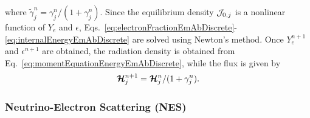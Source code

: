 \documentclass[10pt,preprint]{aastex}
\begin{document}
where $\tilde{\gamma}_{j}^{n}=\gamma_{j}^{n}/(1+\gamma_{j}^{n})$.  
Since the equilibrium density $\mathcal{J}_{0,j}$ is a nonlinear function of $Y_{e}$ and $\epsilon$, Eqs.~\eqref{eq:electronFractionEmAbDiscrete}-\eqref{eq:internalEnergyEmAbDiscrete} are solved using Newton's method.  
Once $Y_{e}^{n+1}$ and $\epsilon^{n+1}$ are obtained, the radiation density is obtained from Eq.~\eqref{eq:momentEquationEnergyEmAbDiscrete}, while the flux is given by
\begin{equation}
  \boldsymbol{\mathcal{H}}_{j}^{n+1}=\boldsymbol{\mathcal{H}}_{j}^{n}/(1+\gamma_{j}^{n}).  
  \label{eq:momentEquationMomentumEmAbDiscrete}
\end{equation}

\subsubsection{Neutrino-Electron Scattering (NES)}
\end{document}
